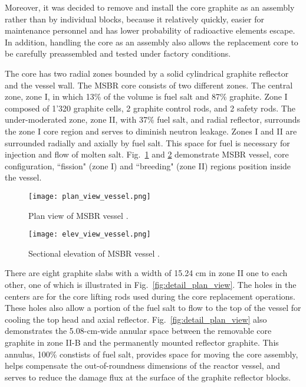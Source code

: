 Moreover, it was decided to remove and install the core graphite as an assembly rather than by individual blocks, because it relatively quickly, easier for maintenance personnel and has lower probability of radioactive elements escape. In addition, handling the core as an assembly also allows the replacement core to be carefully preassembled and tested under factory conditions.

The core has two radial zones bounded by a solid cylindrical graphite reflector 
and the vessel wall. The \gls{MSBR} core consists of two different zones. The central zone, zone I, in which 13\% of the volume is fuel salt and 87\% graphite. 
Zone I composed of 1'320 graphite cells, 2 graphite control rods, and 
2 safety rods. The under-moderated zone, zone 
II, with 37\% fuel salt, and radial reflector, surrounds the zone I core region 
and serves to diminish neutron leakage. Zones I and II are surrounded radially and axially by fuel salt. This space for fuel is necessary for injection and flow of molten salt. Fig.~\ref{fig:ref_plan_msbr} and \ref{fig:ref_sect_msbr} demonstrate \gls{MSBR} vessel, core configuration, ``fission" (zone I) and ``breeding" (zone II) regions position inside the vessel.

\begin{figure}[hbp!] %
  \centering
  \vspace{-0.3em}
  \texttt{[image: plan\_view\_vessel.png]}
  \caption{Plan view of \gls{MSBR} vessel \cite{robertson_conceptual_1971}.}
  \vspace{-0.6em}
  \label{fig:ref_plan_msbr}
\end{figure}
\FloatBarrier

\begin{figure}[hbp!] %
  \centering
  \vspace{-0.3em}
  \texttt{[image: elev\_view\_vessel.png]}
  \caption{Sectional elevation of \gls{MSBR} vessel \cite{robertson_conceptual_1971}.}
  \vspace{-0.6em}
  \label{fig:ref_sect_msbr}
\end{figure}
\FloatBarrier

There are eight graphite slabs with a width of 15.24 cm in zone II one to each other, one of which is illustrated in Fig.~\ref{fig:detail_plan_view}. The holes in the centers are for the core lifting rods used during the core replacement operations. These holes also allow a portion of the fuel salt to flow to the top of the vessel for cooling the top head and axial reflector. Fig.~\ref{fig:detail_plan_view} also demonstrates the 5.08-cm-wide annular space between the removable core graphite in zone II-B and the permanently mounted reflector graphite. This annulus, 100\% constists of fuel salt, provides space for moving the core assembly, helps compensate the out-of-roundness dimensions of the reactor vessel, and serves to reduce the damage flux at the surface of the graphite reflector blocks.

